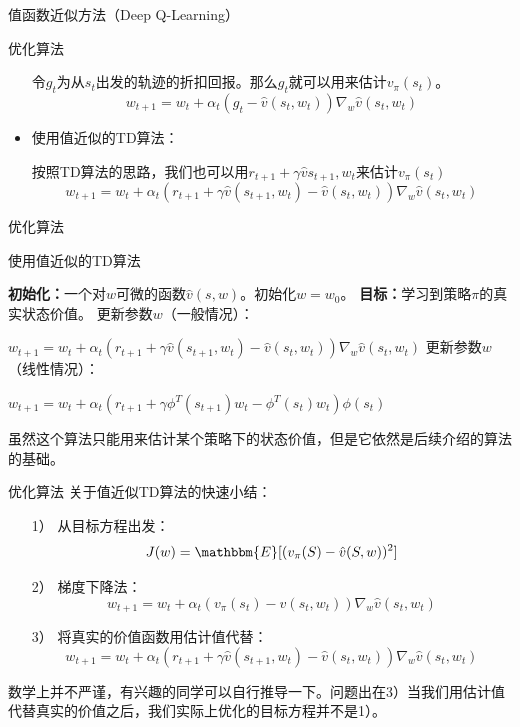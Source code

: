 \begin{section}{值函数近似方法\alert{（Deep Q-Learning）}}
\begin{frame}{优化算法}
\begin{itemize}
        令$g_t$为从$s_t$出发的轨迹的折扣回报。那么$g_t$就可以用来估计$v_\pi(s_t)$。
        \[
            w_{t+1}=w_t+\alpha_t(g_t-\hat{v}(s_t,w_t))\nabla_w\hat{v}(s_t,w_t)
        \]
        \item 使用值近似的TD算法：
        
        按照TD算法的思路，我们也可以用$r_{t+1}+\gamma \hat{v}{s_{t+1},w_t}$来估计$v_\pi(s_t)$
        \[
            w_{t+1}=w_t+\alpha_t(r_{t+1}+\gamma \hat{v}(s_{t+1},w_t)-\hat{v}(s_t,w_t))\nabla_w\hat{v}(s_t,w_t)
        \]
    \end{itemize}
\end{frame}

\begin{frame}{优化算法}
    \begin{block}{使用值近似的TD算法}
        \begin{algorithmic}[1]
            \State \textbf{初始化：}一个对$w$可微的函数$\hat{v}(s,w)$。初始化$w=w_0$。
            \State \textbf{目标：}学习到策略$\pi$的真实状态价值。
                    \State 更新参数$w$（一般情况）：

                    $w_{t+1}=w_t+\alpha_t(r_{t+1}+\gamma \hat{v}(s_{t+1},w_t)-\hat{v}(s_t,w_t))\nabla_w\hat{v}(s_t,w_t)$
                    \State 更新参数$w$（线性情况）：

                    $w_{t+1}=w_t+\alpha_t(r_{t+1}+\gamma \phi^T(s_{t+1})w_t-\phi^T(s_t)w_t)\phi(s_t)$
                \EndFor
            \EndFor
        \end{algorithmic}
    \end{block}
    虽然这个算法只能用来估计某个策略下的状态价值，但是它依然是后续介绍的算法的基础。
\end{frame}

\begin{frame}{优化算法}
    关于值近似TD算法的快速小结：
    \begin{itemize}
        \item[1）] 从目标方程出发：
        \[
            J(w)=\mathbbm{E}[(v_\pi(S)-\hat{v}(S,w))^2]
        \]
        \item[2）] 梯度下降法：
        \[
            w_{t+1}=w_t+\alpha_t(v_\pi(s_t)-\hat{v}(s_t,w_t))\nabla_w\hat{v}(s_t,w_t)
        \]
        \item[3）] 将真实的价值函数用估计值代替：  
        \[
            w_{t+1}=w_t+\alpha_t(r_{t+1}+\gamma \hat{v}(s_{t+1},w_t)-\hat{v}(s_t,w_t))\nabla_w\hat{v}(s_t,w_t)
        \]
    \end{itemize}
    数学上并不严谨，有兴趣的同学可以自行推导一下。问题出在3）当我们用估计值代替真实的价值之后，我们实际上优化的目标方程并不是1）。
\end{frame}


\end{section}
